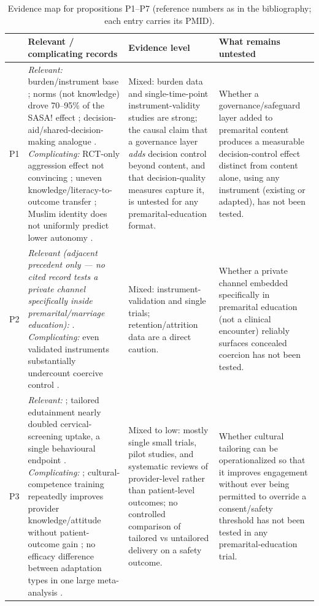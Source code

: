 \begin{table}[t]
\centering\footnotesize
\caption{Evidence map for propositions P1--P7 (reference numbers as in the bibliography; each entry carries its PMID).}
\label{tab:evidencemap}
\begin{tabularx}{\textwidth}{@{}p{0.9cm}YYY@{}}
\toprule
& \textbf{Relevant / complicating records} & \textbf{Evidence level} & \textbf{What remains untested}\\
\midrule
P1 & \emph{Relevant:} burden/instrument base \cite{ref1,ref2,ref5,ref16,ref18,ref92}; norms (not knowledge) drove 70--95\% of the SASA! effect \cite{ref26,ref25}; decision-aid/shared-decision-making analogue \cite{ref14,ref15}. \emph{Complicating:} RCT-only aggression effect not convincing \cite{ref6,ref33,ref7,ref8}; uneven knowledge/literacy-to-outcome transfer \cite{ref34,ref35}; Muslim identity does not uniformly predict lower autonomy \cite{ref93}. & Mixed: burden data and single-time-point instrument-validity studies are strong; the causal claim that a governance layer \emph{adds} decision control beyond content, and that decision-quality measures capture it, is untested for any premarital-education format. & Whether a governance/safeguard layer added to premarital content produces a measurable decision-control effect distinct from content alone, using any instrument (existing or adapted), has not been tested.\\
\addlinespace
P2 & \emph{Relevant (adjacent precedent only --- no cited record tests a private channel specifically inside premarital/marriage education):} \cite{ref94,ref95,ref96,ref97,ref98,ref99}. \emph{Complicating:} even validated instruments substantially undercount coercive control \cite{ref51}. & Mixed: instrument-validation and single trials; retention/attrition data are a direct caution. & Whether a private channel embedded specifically in premarital education (not a clinical encounter) reliably surfaces concealed coercion has not been tested.\\
\addlinespace
P3 & \emph{Relevant:} \cite{ref100,ref101,ref27}; tailored edutainment nearly doubled cervical-screening uptake, a single behavioural endpoint \cite{ref71}. \emph{Complicating:} \cite{ref102,ref103,ref19}; cultural-competence training repeatedly improves provider knowledge/attitude without patient-outcome gain \cite{ref56,ref57,ref55}; no efficacy difference between adaptation types in one large meta-analysis \cite{ref89}. & Mixed to low: mostly single small trials, pilot studies, and systematic reviews of provider-level rather than patient-level outcomes; no controlled comparison of tailored vs untailored delivery on a safety outcome. & Whether cultural tailoring can be operationalized so that it improves engagement without ever being permitted to override a consent/safety threshold has not been tested in any premarital-education trial.\\

\end{tabularx}
\end{table}

